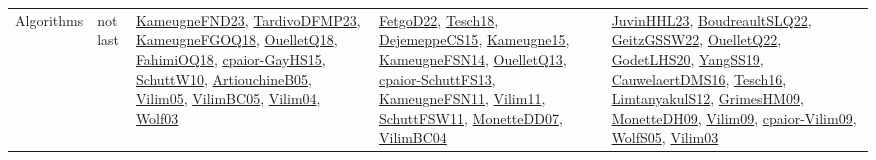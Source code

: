 {\begin{longtable}{lp{3cm}>{\raggedright}p{6cm}>{\raggedright}p{6cm}p{8cm}}
Algorithms & not last & \href{papers/KameugneFND23.pdf}{KameugneFND23}\cite{KameugneFND23}, \href{papers/TardivoDFMP23.pdf}{TardivoDFMP23}\cite{TardivoDFMP23}, \href{papers/KameugneFGOQ18.pdf}{KameugneFGOQ18}\cite{KameugneFGOQ18}, \href{papers/OuelletQ18.pdf}{OuelletQ18}\cite{OuelletQ18}, \href{articles/FahimiOQ18.pdf}{FahimiOQ18}\cite{FahimiOQ18}, \href{papers/cpaior-GayHS15.pdf}{cpaior-GayHS15}\cite{cpaior-GayHS15}, \href{papers/SchuttW10.pdf}{SchuttW10}\cite{SchuttW10}, \href{papers/ArtiouchineB05.pdf}{ArtiouchineB05}\cite{ArtiouchineB05}, \href{papers/Vilim05.pdf}{Vilim05}\cite{Vilim05}, \href{articles/VilimBC05.pdf}{VilimBC05}\cite{VilimBC05}, \href{papers/Vilim04.pdf}{Vilim04}\cite{Vilim04}, \href{papers/Wolf03.pdf}{Wolf03}\cite{Wolf03} & \href{articles/FetgoD22.pdf}{FetgoD22}\cite{FetgoD22}, \href{papers/Tesch18.pdf}{Tesch18}\cite{Tesch18}, \href{papers/DejemeppeCS15.pdf}{DejemeppeCS15}\cite{DejemeppeCS15}, \href{articles/Kameugne15.pdf}{Kameugne15}\cite{Kameugne15}, \href{articles/KameugneFSN14.pdf}{KameugneFSN14}\cite{KameugneFSN14}, \href{papers/OuelletQ13.pdf}{OuelletQ13}\cite{OuelletQ13}, \href{papers/cpaior-SchuttFS13.pdf}{cpaior-SchuttFS13}\cite{cpaior-SchuttFS13}, \href{papers/KameugneFSN11.pdf}{KameugneFSN11}\cite{KameugneFSN11}, \href{papers/Vilim11.pdf}{Vilim11}\cite{Vilim11}, \href{articles/SchuttFSW11.pdf}{SchuttFSW11}\cite{SchuttFSW11}, \href{papers/MonetteDD07.pdf}{MonetteDD07}\cite{MonetteDD07}, \href{papers/VilimBC04.pdf}{VilimBC04}\cite{VilimBC04} & \href{papers/JuvinHHL23.pdf}{JuvinHHL23}\cite{JuvinHHL23}, \href{papers/BoudreaultSLQ22.pdf}{BoudreaultSLQ22}\cite{BoudreaultSLQ22}, \href{papers/GeitzGSSW22.pdf}{GeitzGSSW22}\cite{GeitzGSSW22}, \href{papers/OuelletQ22.pdf}{OuelletQ22}\cite{OuelletQ22}, \href{papers/GodetLHS20.pdf}{GodetLHS20}\cite{GodetLHS20}, \href{papers/YangSS19.pdf}{YangSS19}\cite{YangSS19}, \href{papers/CauwelaertDMS16.pdf}{CauwelaertDMS16}\cite{CauwelaertDMS16}, \href{papers/Tesch16.pdf}{Tesch16}\cite{Tesch16}, \href{articles/LimtanyakulS12.pdf}{LimtanyakulS12}\cite{LimtanyakulS12}, \href{papers/GrimesHM09.pdf}{GrimesHM09}\cite{GrimesHM09}, \href{papers/MonetteDH09.pdf}{MonetteDH09}\cite{MonetteDH09}, \href{papers/Vilim09.pdf}{Vilim09}\cite{Vilim09}, \href{papers/cpaior-Vilim09.pdf}{cpaior-Vilim09}\cite{cpaior-Vilim09}, \href{papers/WolfS05.pdf}{WolfS05}\cite{WolfS05}, \href{papers/Vilim03.pdf}{Vilim03}\cite{Vilim03}\\

\end{longtable}}
